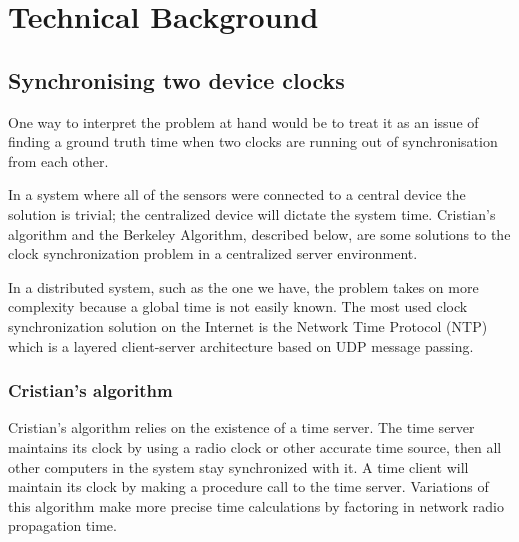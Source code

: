 \chapter{Technical Background}
\label{chap:technical}
%
%
%

\section{Synchronising two device clocks}
One way to interpret the problem at hand would be to treat it as an issue of finding a ground truth time when two clocks are running out of synchronisation from each other.

In a system where all of the sensors were connected to a central device the solution is trivial; the centralized device will dictate the system time. Cristian's algorithm and the Berkeley Algorithm, described below, are some solutions to the clock synchronization problem in a centralized server environment.

In a distributed system, such as the one we have, the problem takes on more complexity because a global time is not easily known. The most used clock synchronization solution on the Internet is the Network Time Protocol (NTP) which is a layered client-server architecture based on UDP message passing.

\subsection{Cristian's algorithm}
Cristian's algorithm relies on the existence of a time server. The time server maintains its clock by using a radio clock or other accurate time source, then all other computers in the system stay synchronized with it. A time client will maintain its clock by making a procedure call to the time server. Variations of this algorithm make more precise time calculations by factoring in network radio propagation time.

